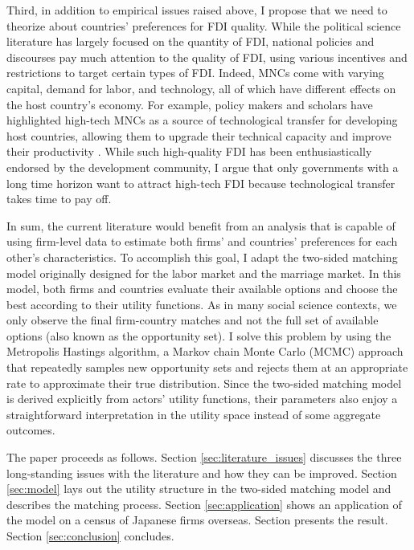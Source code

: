Third, in addition to empirical issues raised above, I propose that we need to theorize about countries' preferences for FDI quality. While the political science literature has largely focused on the quantity of FDI, national policies and discourses pay much attention to the quality of FDI, using various incentives and restrictions to target certain types of FDI. Indeed, MNCs come with varying capital, demand for labor, and technology, all of which have different effects on the host country's economy. For example, policy makers and scholars have highlighted high-tech MNCs as a source of technological transfer for developing host countries, allowing them to upgrade their technical capacity and improve their productivity \citep{Findlay1978, Nunnenkamp2004}. While such high-quality FDI has been enthusiastically endorsed by the development community, I argue that only governments with a long time horizon want to attract high-tech FDI because technological transfer takes time to pay off.

In sum, the current literature would benefit from an analysis that is capable of using firm-level data to estimate both firms' and countries' preferences for each other's characteristics. To accomplish this goal, I adapt the two-sided matching model originally designed for the labor market and the marriage market. In this model, both firms and countries evaluate their available options and choose the best according to their utility functions. As in many social science contexts, we only observe the final firm-country matches and not the full set of available options (also known as the opportunity set). I solve this problem by using the Metropolis Hastings algorithm, a Markov chain Monte Carlo (MCMC) approach that repeatedly samples new opportunity sets and rejects them at an appropriate rate to approximate their true distribution. Since the two-sided matching model is derived explicitly from actors' utility functions, their parameters also enjoy a straightforward interpretation in the utility space instead of some aggregate outcomes.

The paper proceeds as follows. Section \ref{sec:literature_issues} discusses the
three long-standing issues with the literature and how they can be improved.
Section \ref{sec:model} lays out the utility structure in the two-sided matching
model and describes the matching process. Section \ref{sec:application} shows an
application of the model on a census of Japanese firms overseas. Section
presents the result. Section \ref{sec:conclusion} concludes.

